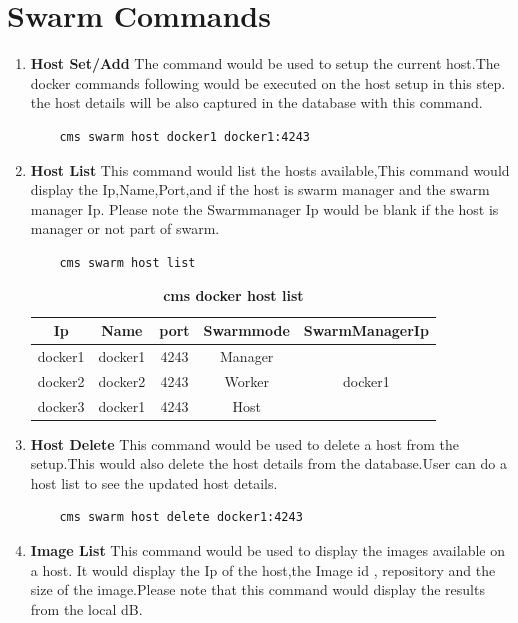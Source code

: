 \documentclass[9pt,twocolumn,twoside]{../../styles/osajnl}
\begin{document}
\section{Swarm Commands}
\begin{enumerate}
    \item \textbf{Host Set/Add}
     The command would be used to setup the current host.The docker commands following would be executed on the host setup in this step. the host details will be also captured in the database with this command.
     
    \begin{verbatim}
    cms swarm host docker1 docker1:4243
    \end{verbatim} 

     
    \item \textbf{Host List}
     This command would list the hosts available,This command would display the Ip,Name,Port,and if the host is swarm manager and the swarm manager Ip. Please note the Swarmmanager Ip would be blank if the host is manager or not part of swarm.
     
    \begin{verbatim}
    cms swarm host list
    \end{verbatim} 

     \begin{table}[htbp]
     \caption{\bf cms docker host list }
     \begin{tabular}{ccccc}
     \hline
      Ip & Name & port & Swarmmode &SwarmManagerIp\\
      \hline
      docker1 & docker1 & 4243 & Manager & \\
      docker2 & docker2 & 4243 & Worker & docker1\\
      docker3 & docker1 & 4243 & Host & \\
     \hline
     \end{tabular}
     \label{tab:tab5}
     \end{table}
     
    \item \textbf{Host Delete}
    This command would be used to delete a host from the setup.This would also delete the host details from the database.User can do a host list to see the updated host details.

    \begin{verbatim}
    cms swarm host delete docker1:4243
    \end{verbatim} 
    
    \item \textbf{Image List}
    This command would be used to display the images available on a host.
    It would display the Ip of the host,the Image id , repository and the size of the image.Please note that this command would display the results from the local dB.
    

\end{enumerate}
\end{document}
